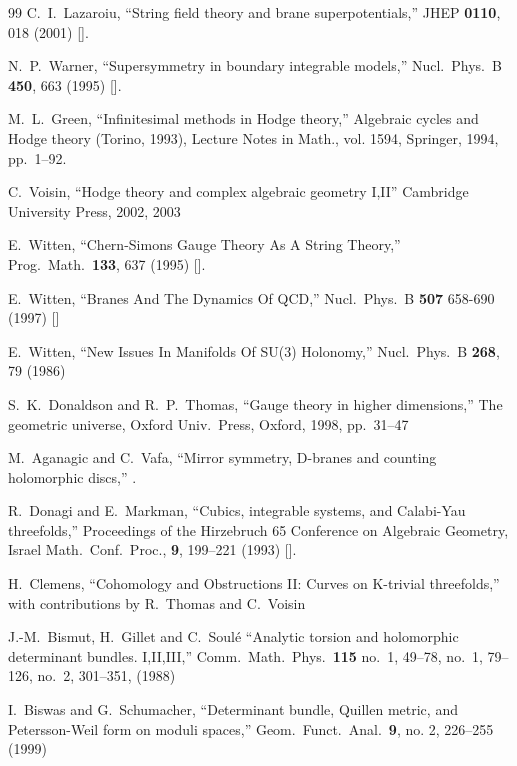 \begin{thebibliography}{99}
  C.~I.~Lazaroiu,
  ``String field theory and brane superpotentials,''
  JHEP {\bf 0110}, 018 (2001)
  [].

 N.~P.~Warner,
  ``Supersymmetry in boundary integrable models,''
  Nucl.\ Phys.\  B {\bf 450}, 663 (1995)
  [].

M.~L.~Green, 
``Infinitesimal methods in {H}odge theory,'' 
Algebraic cycles and Hodge theory (Torino, 1993), 
Lecture Notes in Math., vol. 1594, Springer,  1994, pp.~1--92.

C.~Voisin,
``Hodge theory and complex algebraic geometry I,II''
Cambridge University Press, 2002, 2003

 E.~Witten,
  ``Chern-Simons Gauge Theory As A String Theory,''
  Prog.\ Math.\  {\bf 133}, 637 (1995)
  [].

E.~Witten,
``Branes And The Dynamics Of QCD,''
Nucl.~Phys.~B {\bf 507} 658-690 (1997)
[]

  E.~Witten,
  ``New Issues In Manifolds Of SU(3) Holonomy,''
  Nucl.\ Phys.\  B {\bf 268}, 79 (1986)

S.~K.~Donaldson and R.~P.~Thomas,
``Gauge theory in higher dimensions,''
The geometric universe, Oxford Univ.\ Press, Oxford, 1998, pp.\ 31--47

M.~Aganagic and C.~Vafa,
``Mirror symmetry, D-branes and counting holomorphic discs,''
.

R.~Donagi and E.~Markman,
``Cubics, integrable systems, and Calabi-Yau threefolds,''
Proceedings of the Hirzebruch 65 Conference on Algebraic Geometry,  
Israel Math.\ Conf.\ Proc., {\bf 9}, 199--221 (1993)
[].

H.~Clemens, 
``Cohomology and Obstructions II: Curves on K-trivial threefolds,''
with contributions by R.~Thomas and C.~Voisin

J.-M.~Bismut, H.~Gillet and C.~Soul\'e
``Analytic torsion and holomorphic determinant bundles. I,II,III,''
Comm.\ Math.\ Phys.\  {\bf 115}  no.~1, 49--78, no.~1, 79--126, no.~2, 
301--351, (1988)

I.~Biswas and G.~Schumacher,
``Determinant bundle, Quillen metric, and Petersson-Weil form on moduli spaces,''  
Geom.\ Funct.\ Anal.\  {\bf 9},  no. 2, 226--255 (1999)


\end{thebibliography}
